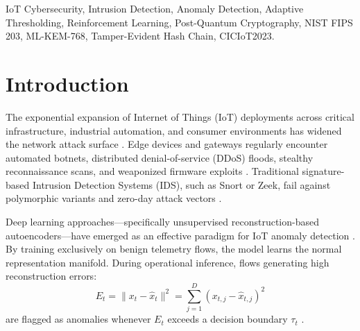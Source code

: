 \documentclass{ieeeaccess}
\begin{document}
\begin{keywords}
IoT Cybersecurity, Intrusion Detection, Anomaly Detection, Adaptive Thresholding, Reinforcement Learning, Post-Quantum Cryptography, NIST FIPS 203, ML-KEM-768, Tamper-Evident Hash Chain, CICIoT2023.
\end{keywords}

\titlepgskip=-15pt
\maketitle

\section{Introduction}
\label{sec:introduction}
The exponential expansion of Internet of Things (IoT) deployments across critical infrastructure, industrial automation, and consumer environments has widened the network attack surface \cite{alcaraz2023,kumar2019}. Edge devices and gateways regularly encounter automated botnets, distributed denial-of-service (DDoS) floods, stealthy reconnaissance scans, and weaponized firmware exploits \cite{bertino2017,kolias2017}. Traditional signature-based Intrusion Detection Systems (IDS), such as Snort or Zeek, fail against polymorphic variants and zero-day attack vectors \cite{roesch1999,paxson1999}.

Deep learning approaches---specifically unsupervised reconstruction-based autoencoders---have emerged as an effective paradigm for IoT anomaly detection \cite{arjunan2024,mirsky2018}. By training exclusively on benign telemetry flows, the model learns the normal representation manifold. During operational inference, flows generating high reconstruction errors:
\begin{equation}
E_t = \|x_t - \hat{x}_t\|^2 = \sum_{j=1}^D (x_{t,j} - \hat{x}_{t,j})^2
\label{eq:recon_err}
\end{equation}
are flagged as anomalies whenever $E_t$ exceeds a decision boundary $\tau_t$ \cite{an2015,zhou2017}.
\end{document}
